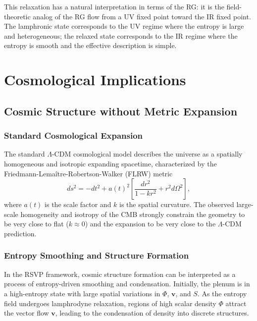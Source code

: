 \documentclass[12pt,a4paper,oneside]{book}
\theoremstyle{definition}
\theoremstyle{plain}
\theoremstyle{remark}
\begin{document}
This relaxation has a natural interpretation in terms of the RG: it is
the field-theoretic analog of the RG flow from a UV fixed point toward
the IR fixed point. The lamphronic state corresponds to the UV regime where
the entropy is large and heterogeneous; the relaxed state corresponds to the
IR regime where the entropy is smooth and the effective description is simple.

\part{Cosmological Implications}

\chapter{Cosmic Structure without Metric Expansion}

\section{Standard Cosmological Expansion}

The standard $\Lambda$-CDM cosmological model describes the universe as
a spatially homogeneous and isotropic expanding spacetime, characterized
by the Friedmann-Lema\^itre-Robertson-Walker (FLRW) metric
\begin{equation}
ds^2 = -dt^2 + a(t)^2\left[\frac{dr^2}{1-kr^2} + r^2d\Omega^2\right],
\end{equation}
where $a(t)$ is the scale factor and $k$ is the spatial curvature.
The observed large-scale homogeneity and isotropy of the CMB strongly
constrain the geometry to be very close to flat ($k \approx 0$) and
the expansion to be very close to the $\Lambda$-CDM prediction.

\section{Entropy Smoothing and Structure Formation}

In the RSVP framework, cosmic structure formation can be interpreted as a
process of entropy-driven smoothing and condensation. Initially, the plenum
is in a high-entropy state with large spatial variations in $\Phi$, $\mathbf{v}$,
and $S$. As the entropy field undergoes lamphrodyne relaxation, regions of
high scalar density $\Phi$ attract the vector flow $\mathbf{v}$, leading to
the condensation of density into discrete structures.
\end{document}
